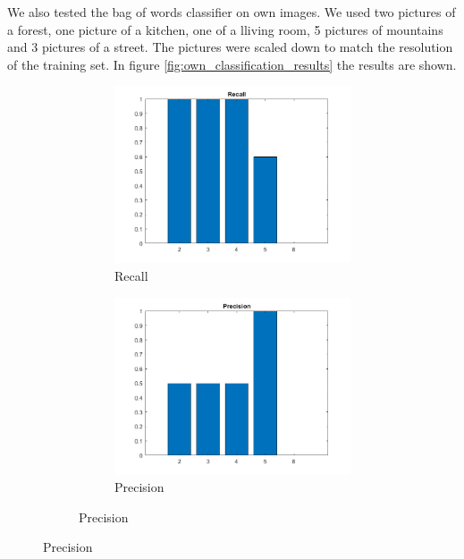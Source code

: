 We also tested the bag of words classifier on own images. We used two pictures of a forest, one picture of a kitchen, one of a lliving room, 5 pictures of mountains and 3 pictures of a street. The pictures were scaled down to match the resolution of the training set. In figure \ref{fig:own_classification_results} the results are shown.
\begin{figure}[h]
	\centering
	\begin{subfigure}{0.3\textwidth}
		\begin{subfigure}[t]{\textwidth}
			\includegraphics[width=\textwidth]{figures/own_recall.png} 
			\caption{Recall}
		\end{subfigure}
		\begin{subfigure}[t]{\textwidth}
			\includegraphics[width=\textwidth]{figures/own_precision.png}
			\caption{Precision}
		\end{subfigure}


\end{subfigure}
\end{figure}

